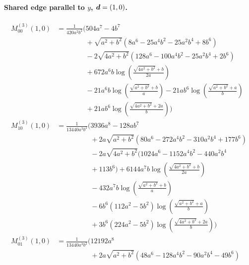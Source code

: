 \paragraph{Shared edge parallel to $y$, $\vb*{d}=(1,0)$.}
\begin{align*}
M^{(3)}_{00}(1,0) &= \frac{1}{420 a^{2} b^{2}}\Bigg(504 a^{7} - 4 b^{7}\\
&\phantom{{}=\frac{1}{420 a^{2} b^{2}}\Bigg(}+ \sqrt{a^{2} + b^{2}}\left(8 a^{6} - 25 a^{4} b^{2} - 25 a^{2} b^{4} + 8 b^{6}\right)\\
&\phantom{{}=\frac{1}{420 a^{2} b^{2}}\Bigg(}- 2 \sqrt{4 a^{2} + b^{2}}\left(128 a^{6} - 100 a^{4} b^{2} - 25 a^{2} b^{4} + 2 b^{6}\right)\\
&\phantom{{}=\frac{1}{420 a^{2} b^{2}}\Bigg(}+ 672 a^{6} b \log\left(\frac{\sqrt{4 a^{2} + b^{2}} + b}{2 a}\right)\\
&\phantom{{}=\frac{1}{420 a^{2} b^{2}}\Bigg(}- 21 a^{6} b \log\left(\frac{\sqrt{a^{2} + b^{2}} + b}{a}\right) - 21 a b^{6} \log\left(\frac{\sqrt{a^{2} + b^{2}} + a}{b}\right)\\
&\phantom{{}=\frac{1}{420 a^{2} b^{2}}\Bigg(}+ 21 a b^{6} \log\left(\frac{\sqrt{4 a^{2} + b^{2}} + 2 a}{b}\right)\Bigg)\\[1.2ex]
M^{(3)}_{10}(1,0) &= \frac{1}{13440 a^{3} b^{2}}\Bigg(3936 a^{8} - 128 a b^{7}\\
&\phantom{{}=\frac{1}{13440 a^{3} b^{2}}\Bigg(}+ 2 a \sqrt{a^{2} + b^{2}}\left(80 a^{6} - 272 a^{4} b^{2} - 310 a^{2} b^{4} + 177 b^{6}\right)\\
&\phantom{{}=\frac{1}{13440 a^{3} b^{2}}\Bigg(}- 2 a \sqrt{4 a^{2} + b^{2}}\bigl(1024 a^{6} - 1152 a^{4} b^{2} - 440 a^{2} b^{4}\\
&\phantom{{}=\frac{1}{13440 a^{3} b^{2}}\Bigg(}+ 113 b^{6}\bigr) + 6144 a^{7} b \log\left(\frac{\sqrt{4 a^{2} + b^{2}} + b}{2 a}\right)\\
&\phantom{{}=\frac{1}{13440 a^{3} b^{2}}\Bigg(}- 432 a^{7} b \log\left(\frac{\sqrt{a^{2} + b^{2}} + b}{a}\right)\\
&\phantom{{}=\frac{1}{13440 a^{3} b^{2}}\Bigg(}- 6 b^{6} \left(112 a^{2} - 5 b^{2}\right) \log\left(\frac{\sqrt{a^{2} + b^{2}} + a}{b}\right)\\
&\phantom{{}=\frac{1}{13440 a^{3} b^{2}}\Bigg(}+ 3 b^{6} \left(224 a^{2} - 5 b^{2}\right) \log\left(\frac{\sqrt{4 a^{2} + b^{2}} + 2 a}{b}\right)\Bigg)\\[1.2ex]
M^{(3)}_{01}(1,0) &= \frac{1}{13440 a^{3} b^{2}}\Bigg(12192 a^{8}\\
&\phantom{{}=\frac{1}{13440 a^{3} b^{2}}\Bigg(}+ 2 a \sqrt{a^{2} + b^{2}}\left(48 a^{6} - 128 a^{4} b^{2} - 90 a^{2} b^{4} - 49 b^{6}\right)\\

\end{align*}
